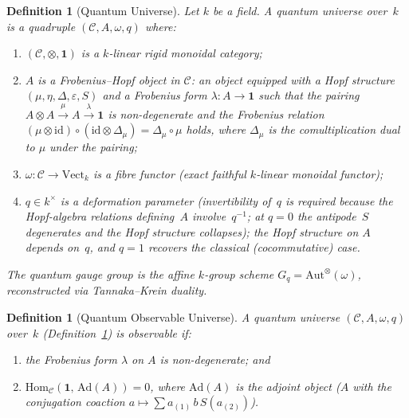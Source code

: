 \documentclass[12pt,a4paper]{report}
\newtheorem{definition}[theorem]{Definition}
\begin{document}
\begin{definition}[Quantum Universe]
\label{def:quantum-universe}
Let $k$ be a field.  A \emph{quantum universe over~$k$} is a quadruple
$(\mathcal{C}, A, \omega, q)$ where:
\begin{enumerate}
  \item $(\mathcal{C}, \otimes, \mathbf{1})$ is a $k$-linear rigid
        monoidal category;
  \item $A$ is a \emph{Frobenius--Hopf object} in $\mathcal{C}$: an object
        equipped with a Hopf structure
        $(\mu, \eta, \Delta, \varepsilon, S)$ and a Frobenius form
        $\lambda \colon A \to \mathbf{1}$ such that the pairing
        $A \otimes A \xrightarrow{\mu} A \xrightarrow{\lambda} \mathbf{1}$
        is non-degenerate and the Frobenius relation
        $(\mu \otimes \mathrm{id}) \circ
        (\mathrm{id} \otimes \Delta_\mu)
        = \Delta_\mu \circ \mu$ holds, where $\Delta_\mu$ is the
        comultiplication dual to $\mu$ under the pairing;
  \item $\omega \colon \mathcal{C} \to \mathrm{Vect}_k$ is a fibre functor
        (exact faithful $k$-linear monoidal functor);
  \item $q \in k^\times$ is a deformation parameter (invertibility of~$q$
        is required because the Hopf-algebra relations defining~$A$
        involve~$q^{-1}$; at $q = 0$ the antipode~$S$ degenerates and
        the Hopf structure collapses); the Hopf structure on
        $A$ depends on~$q$, and $q = 1$ recovers the classical
        (cocommutative) case.
\end{enumerate}
The \emph{quantum gauge group} is the affine $k$-group scheme
$G_q = \mathrm{Aut}^{\otimes}(\omega)$, reconstructed via
Tannaka--Krein duality.
\end{definition}

\begin{definition}[Quantum Observable Universe]
\label{def:quantum-observable-universe}
A quantum universe $(\mathcal{C}, A, \omega, q)$ over~$k$
(Definition~\ref{def:quantum-universe}) is \emph{observable} if:
\begin{enumerate}
  \item the Frobenius form $\lambda$ on $A$ is non-degenerate; and
  \item $\mathrm{Hom}_{\mathcal{C}}(\mathbf{1},\, \mathrm{Ad}(A)) = 0$,
        where $\mathrm{Ad}(A)$ is the adjoint object
        ($A$ with the conjugation coaction
        $a \mapsto \textstyle\sum a_{(1)}\, b\, S(a_{(2)})$).
\end{enumerate}
\end{definition}
\end{document}
